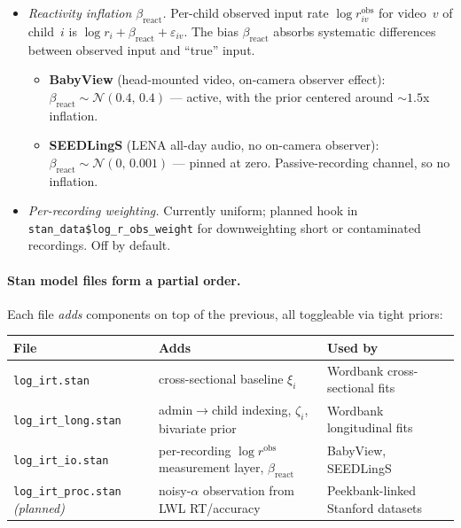 \documentclass[11pt]{article}
\begin{document}
\begin{itemize}[leftmargin=1.3em]
\item \emph{Reactivity inflation \(\beta_{\text{react}}\).} Per-child
  observed input rate \(\log r^{\mathrm{obs}}_{iv}\) for video~\(v\) of
  child~\(i\) is
  \(\log r_i + \beta_{\text{react}} + \varepsilon_{iv}\). The bias
  \(\beta_{\text{react}}\) absorbs systematic differences between
  observed input and ``true'' input.
  \begin{itemize}
  \item \textbf{BabyView} (head-mounted video, on-camera observer
    effect): \(\beta_{\text{react}} \sim \mathcal{N}(0.4,\,0.4)\) ---
    active, with the prior centered around \(\sim\!1.5\)x inflation.
  \item \textbf{SEEDLingS} (LENA all-day audio, no on-camera observer):
    \(\beta_{\text{react}} \sim \mathcal{N}(0,\,0.001)\) --- pinned at
    zero. Passive-recording channel, so no inflation.
  \end{itemize}
\item \emph{Per-recording weighting.} Currently uniform; planned
  hook in \texttt{stan\_data\$log\_r\_obs\_weight} for downweighting
  short or contaminated recordings. Off by default.
\end{itemize}

\paragraph{Stan model files form a partial order.} Each file
\emph{adds} components on top of the previous, all toggleable via
tight priors:

\begin{center}
\small
\begin{tabular}{@{}lll@{}}
\toprule
File & Adds & Used by \\
\midrule
\texttt{log\_irt.stan} & cross-sectional baseline \(\xi_i\) & Wordbank cross-sectional fits \\
\texttt{log\_irt\_long.stan} & admin\(\to\)child indexing, \(\zeta_i\), bivariate prior & Wordbank longitudinal fits \\
\texttt{log\_irt\_io.stan} & per-recording \(\log r^{\mathrm{obs}}\) measurement layer, \(\beta_{\text{react}}\) & BabyView, SEEDLingS \\
\texttt{log\_irt\_proc.stan} \emph{(planned)} & noisy-\(\alpha\) observation from LWL RT/accuracy & Peekbank-linked Stanford datasets \\
\bottomrule
\end{tabular}
\end{center}
\end{document}
